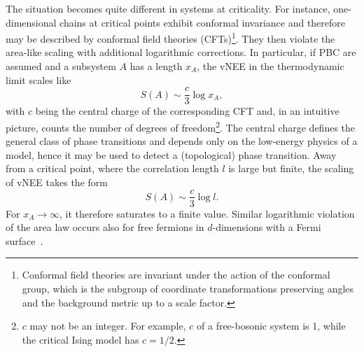 The situation becomes quite different in systems at criticality. For instance, one-dimensional chains at critical points exhibit conformal invariance and therefore may be described by conformal field theories (CFTs)\footnote{Conformal field theories are invariant under the action of the conformal group, which is the subgroup of coordinate transformations preserving angles and the background metric up to a scale factor.}. They then violate the area-like scaling with additional logarithmic corrections. In particular, if PBC are assumed and a subsystem $A$ has a length $x_A$, the vNEE in the thermodynamic limit scales like
\begin{equation}
S (A) \sim \frac{c}{3} \log x_A, 
\label{eq:area_law_log}
\end{equation}
with $c$ being the central charge of the corresponding CFT and, in an intuitive picture, counts the number of degrees of freedom\footnote{$c$ may not be an integer. For example, $c$ of a free-bosonic system is 1, while the critical Ising model has $c = 1/2$.}. The central charge defines the general class of phase transitions and depends only on the low-energy physics of a model, hence it may be used to detect a (topological) phase transition. Away from a critical point, where the correlation length $l$ is large but finite, the scaling of vNEE takes the form
\begin{equation}
S (A) \sim \frac{c}{3} \log l.
\label{eq:area_law_log_finite}
\end{equation}
For $x_A \rightarrow \infty$, it therefore saturates to a finite value. Similar logarithmic violation of the area law occurs also for free fermions in $d$-dimensions with a Fermi surface~\cite{PhysRevLett.96.010404, PhysRevLett.96.100503,PhysRevLett.105.050502}.
